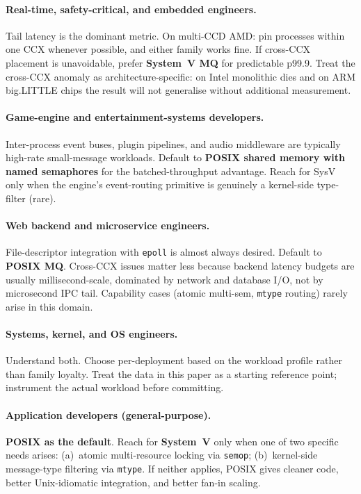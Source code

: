 \documentclass[a4paper,11pt]{article}
\begin{document}
\paragraph{Real-time, safety-critical, and embedded engineers.}
Tail latency is the dominant metric. On multi-CCD AMD: pin
processes within one CCX whenever possible, and either family
works fine. If cross-CCX placement is unavoidable, prefer
\textbf{System~V MQ} for predictable p99.9. Treat the cross-CCX
anomaly as architecture-specific: on Intel monolithic dies and on
ARM big.LITTLE chips the result will not generalise without
additional measurement.

\paragraph{Game-engine and entertainment-systems developers.}
Inter-process event buses, plugin pipelines, and audio middleware
are typically high-rate small-message workloads. Default to
\textbf{POSIX shared memory with named semaphores} for the
batched-throughput advantage. Reach for SysV only when the engine's
event-routing primitive is genuinely a kernel-side type-filter
(rare).

\paragraph{Web backend and microservice engineers.}
File-descriptor integration with \texttt{epoll} is almost
always desired. Default to \textbf{POSIX MQ}. Cross-CCX issues
matter less because backend latency budgets are usually
millisecond-scale, dominated by network and database I/O, not by
microsecond IPC tail. Capability cases (atomic multi-sem,
\texttt{mtype} routing) rarely arise in this domain.

\paragraph{Systems, kernel, and OS engineers.}
Understand both. Choose per-deployment based on the workload
profile rather than family loyalty. Treat the data in this paper as
a starting reference point; instrument the actual workload before
committing.

\paragraph{Application developers (general-purpose).}
\textbf{POSIX as the default}. Reach for \textbf{System~V} only
when one of two specific needs arises: (a)~atomic multi-resource
locking via \texttt{semop}; (b)~kernel-side message-type filtering
via \texttt{mtype}. If neither applies, POSIX gives cleaner code,
better Unix-idiomatic integration, and better fan-in scaling.
\end{document}
